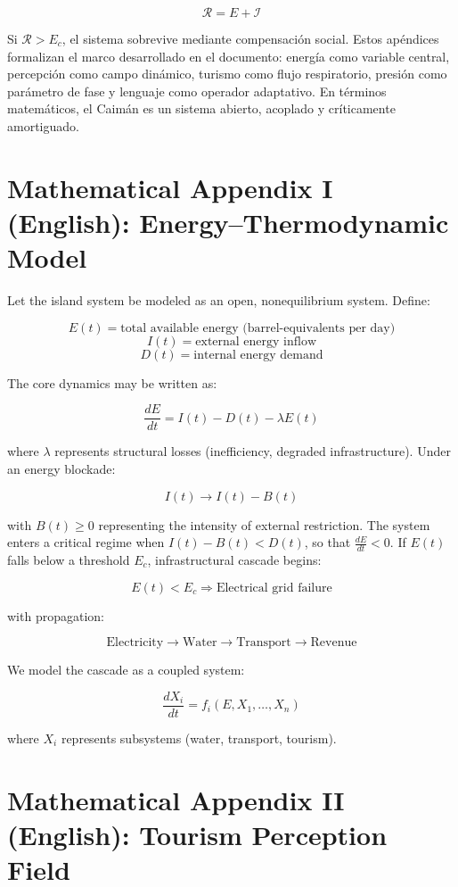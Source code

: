 \documentclass[12pt]{article}
\begin{document}
\[
\mathcal{R} = E + \mathcal{I}
\]

Si \( \mathcal{R} > E_c \), el sistema sobrevive mediante compensación social. Estos apéndices formalizan el marco desarrollado en el documento: energía como variable central, percepción como campo dinámico, turismo como flujo respiratorio, presión como parámetro de fase y lenguaje como operador adaptativo. En términos matemáticos, el Caimán es un sistema abierto, acoplado y críticamente amortiguado.

\section{Mathematical Appendix I (English): Energy--Thermodynamic Model}

Let the island system be modeled as an open, nonequilibrium system. Define:

\[
E(t) = \text{total available energy (barrel-equivalents per day)}
\]
\[
I(t) = \text{external energy inflow}
\]
\[
D(t) = \text{internal energy demand}
\]

The core dynamics may be written as:

\[
\frac{dE}{dt} = I(t) - D(t) - \lambda E(t)
\]

where \( \lambda \) represents structural losses (inefficiency, degraded infrastructure). Under an energy blockade:

\[
I(t) \to I(t) - B(t)
\]

with \( B(t) \ge 0 \) representing the intensity of external restriction. The system enters a critical regime when \( I(t) - B(t) < D(t) \), so that \( \frac{dE}{dt} < 0 \). If \( E(t) \) falls below a threshold \( E_c \), infrastructural cascade begins:

\[
E(t) < E_c \Rightarrow \text{Electrical grid failure}
\]

with propagation:

\[
\text{Electricity} \to \text{Water} \to \text{Transport} \to \text{Revenue}
\]

We model the cascade as a coupled system:

\[
\frac{dX_i}{dt} = f_i(E, X_1, \dots, X_n)
\]

where \( X_i \) represents subsystems (water, transport, tourism).

\section{Mathematical Appendix II (English): Tourism Perception Field}
\end{document}
